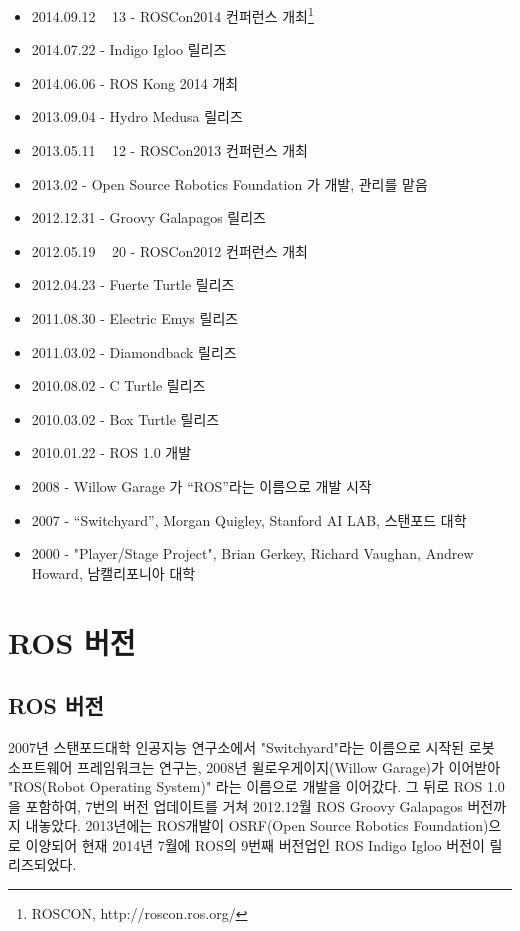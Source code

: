 \begin{itemize}
\item 2014.09.12 ~ 13 - ROSCon2014 컨퍼런스 개최\footnote{ROSCON, http://roscon.ros.org/}
\item 2014.07.22 - Indigo Igloo 릴리즈
\item 2014.06.06 - ROS Kong 2014 개최
\item 2013.09.04 - Hydro Medusa 릴리즈
\item 2013.05.11 ~ 12 - ROSCon2013 컨퍼런스 개최
\item 2013.02 - Open Source Robotics Foundation 가 개발, 관리를 맡음
\item 2012.12.31 - Groovy Galapagos 릴리즈
\item 2012.05.19 ~ 20 - ROSCon2012 컨퍼런스 개최
\item 2012.04.23 - Fuerte Turtle 릴리즈
\item 2011.08.30 - Electric Emys 릴리즈
\item 2011.03.02 - Diamondback 릴리즈
\item 2010.08.02 - C Turtle 릴리즈
\item 2010.03.02 - Box Turtle 릴리즈
\item 2010.01.22 - ROS 1.0 개발
\item 2008 - Willow Garage 가 “ROS”라는 이름으로 개발 시작
\item 2007 - “Switchyard”, Morgan Quigley, Stanford AI LAB, 스탠포드 대학
\item 2000 - "Player/Stage Project", Brian Gerkey, Richard Vaughan, Andrew Howard, 남캘리포니아 대학
\end{itemize}


\section{ROS 버전}

\subsection{ROS 버전}

2007년 스탠포드대학 인공지능 연구소에서 "Switchyard"라는 이름으로 시작된 로봇 소프트웨어 프레임워크는 연구는, 2008년 윌로우게이지(Willow Garage)가 이어받아 "ROS(Robot Operating System)" 라는 이름으로 개발을 이어갔다. 그 뒤로 ROS 1.0을 포함하여, 7번의 버전 업데이트를 거쳐 2012.12월 ROS Groovy Galapagos 버전까지 내놓았다. 2013년에는 ROS개발이 OSRF(Open Source Robotics Foundation)으로 이양되어 현재 2014년 7월에 ROS의 9번째 버전업인 ROS Indigo Igloo 버전이 릴리즈되었다. 

